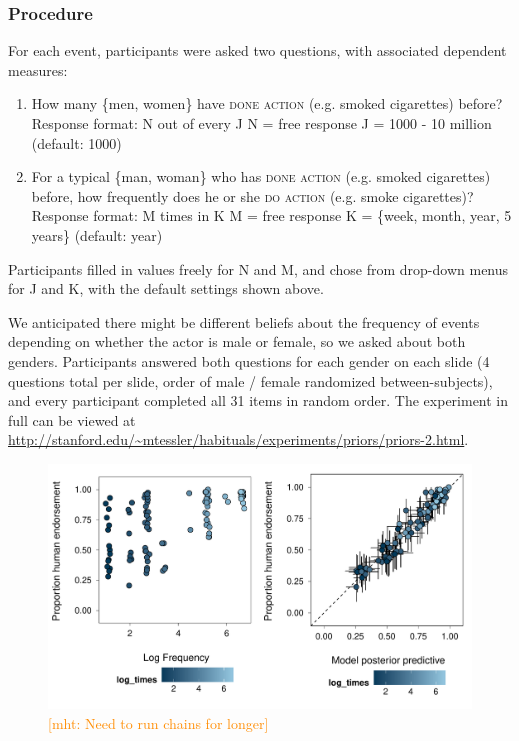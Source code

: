 \documentclass[10pt,letterpaper]{article}
\newcommand{\ndg}[1]{\textcolor{Green}{[ndg: #1]}}
\newcommand{\mht}[1]{\textcolor{DarkOrange}{[mht: #1]}}
\begin{document}
\subsubsection{Procedure}

For each event, participants were asked two questions, with associated dependent measures:
\begin{enumerate}
\item How many \{men, women\} have \textsc{done action} (e.g. smoked cigarettes) before?
\subitem Response format: N out of every J
\subitem N = free response
\subitem J = 1000 - 10 million (default: 1000)
\item For a typical \{man, woman\} who has \textsc{done action}  (e.g. smoked cigarettes) before, how frequently does he or she \textsc{do action} (e.g. smoke cigarettes)?
\subitem Response format: M times in K
\subitem M = free response
\subitem K = \{week, month, year, 5 years\} (default: year)
\end{enumerate}
Participants filled in values freely for N and M, and chose from drop-down menus for J and K, with the default settings shown above. 

We anticipated there might be different beliefs about the frequency of events depending on whether the actor is male or female, so we asked about both genders. Participants answered both questions for each gender on each slide (4 questions total per slide, order of male / female randomized between-subjects), and every participant completed all 31 items in random order.
The experiment in full can be viewed at \url{http://stanford.edu/~mtessler/habituals/experiments/priors/priors-2.html}.

\begin{figure}[t]
\centering
  \includegraphics[width=\textwidth]{tj-scatter-2}
  \caption{\mht{Need to run chains for longer}}
  \label{fig:tjScatters}
\end{figure}
\end{document}
